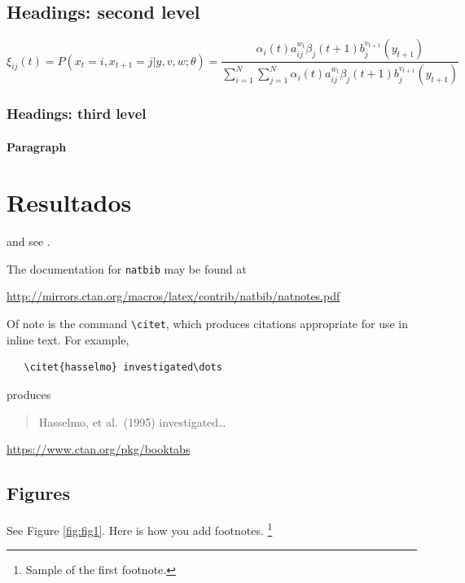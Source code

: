 \documentclass{article}
\begin{document}
\subsection{Headings: second level}
\lipsum[5]
\begin{equation}
\xi _{ij}(t)=P(x_{t}=i,x_{t+1}=j|y,v,w;\theta)= {\frac {\alpha _{i}(t)a^{w_t}_{ij}\beta _{j}(t+1)b^{v_{t+1}}_{j}(y_{t+1})}{\sum _{i=1}^{N} \sum _{j=1}^{N} \alpha _{i}(t)a^{w_t}_{ij}\beta _{j}(t+1)b^{v_{t+1}}_{j}(y_{t+1})}}
\end{equation}

\subsubsection{Headings: third level}
\lipsum[6]

\paragraph{Paragraph}
\lipsum[7]

\section{Resultados}
\label{sec:others}
\lipsum[8] \cite{kour2014real,kour2014fast} and see \cite{hadash2018estimate}.

The documentation for \verb+natbib+ may be found at
\begin{center}
  \url{http://mirrors.ctan.org/macros/latex/contrib/natbib/natnotes.pdf}
\end{center}
Of note is the command \verb+\citet+, which produces citations
appropriate for use in inline text.  For example,
\begin{verbatim}
   \citet{hasselmo} investigated\dots
\end{verbatim}
produces
\begin{quote}
  Hasselmo, et al.\ (1995) investigated\dots
\end{quote}

\begin{center}
  \url{https://www.ctan.org/pkg/booktabs}
\end{center}


\subsection{Figures}
\lipsum[10] 
See Figure \ref{fig:fig1}. Here is how you add footnotes. \footnote{Sample of the first footnote.}
\lipsum[11] 
\end{document}

